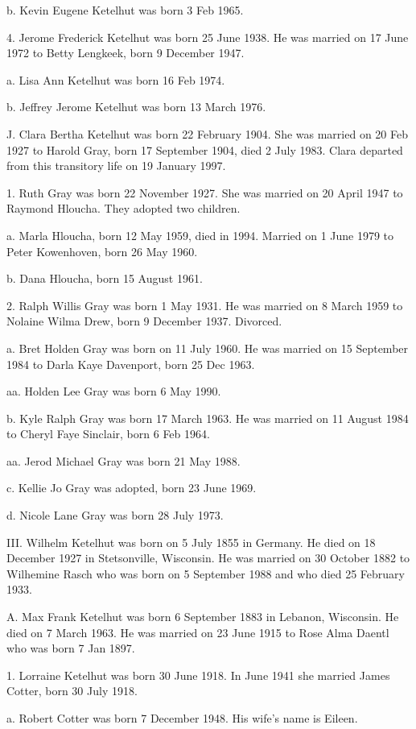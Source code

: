 \documentclass[a4paper]{article}
\begin{document}
b. Kevin Eugene Ketelhut was born 3 Feb 1965.

4. Jerome Frederick Ketelhut was born 25 June 1938.  He was married on 17 June 1972 to Betty Lengkeek, born 9 December 1947.

a. Lisa Ann Ketelhut was born 16 Feb 1974.

b. Jeffrey Jerome Ketelhut was born 13 March 1976.

J. Clara Bertha Ketelhut was born 22 February 1904.  She was married on 20 Feb 1927 to Harold Gray, born 17 September 1904, died 2 July 1983.  Clara departed from this transitory life on 19 January 1997.  

1. Ruth Gray was born 22 November 1927.  She was married on 20 April 1947 to Raymond Hloucha.  They adopted two children.

a. Marla Hloucha, born 12 May 1959, died in 1994.  Married  on 1 June 1979 to Peter Kowenhoven, born 26 May 1960.

b. Dana Hloucha, born 15 August 1961.

2. Ralph Willis Gray was born 1 May 1931.  He was married on 8 March 1959 to Nolaine Wilma Drew, born 9 December 1937.  Divorced.

a. Bret Holden Gray was born on 11 July 1960.  He was married on 15 September  1984 to Darla Kaye Davenport, born 25 Dec 1963.

aa. Holden Lee Gray was born 6 May 1990.

b. Kyle Ralph Gray was born 17 March 1963.  He was married on 11 August 1984 to Cheryl Faye Sinclair, born 6 Feb 1964.

aa. Jerod Michael Gray was born 21 May 1988.

c. Kellie Jo Gray was adopted, born 23 June 1969.

d. Nicole Lane Gray was born 28 July 1973.

III. Wilhelm Ketelhut was born on 5 July 1855 in Germany.  He died on 18 December 1927 in Stetsonville, Wisconsin.  He was married on 30 October 1882 to Wilhemine Rasch who was born on 5 September 1988 and who died 25 February 1933.   

A. Max Frank Ketelhut was born 6 September 1883 in Lebanon, Wisconsin.  He died on 7 March 1963.  He was married on 23 June 1915 to Rose Alma Daentl who was born 7 Jan 1897.  

1. Lorraine Ketelhut was born 30 June 1918.  In June 1941 she married James Cotter, born 30 July 1918.  

a. Robert  Cotter was born 7 December 1948.  His wife's name is Eileen.
\end{document}
